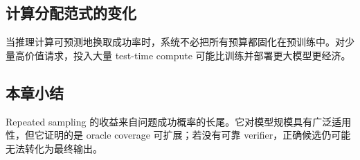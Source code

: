 \subsection{计算分配范式的变化}

当推理计算可预测地换取成功率时，系统不必把所有预算都固化在预训练中。对少量高价值请求，投入大量 test-time compute 可能比训练并部署更大模型更经济。


\subsection{本章小结}

Repeated sampling 的收益来自问题成功概率的长尾。它对模型规模具有广泛适用性，但它证明的是 oracle coverage 可扩展；若没有可靠 verifier，正确候选仍可能无法转化为最终输出。

